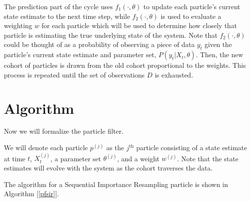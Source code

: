 	The prediction part of the cycle uses $f_1 (\cdot, \theta)$ to update each particle's current state estimate to the next time step, while $f_2 (\cdot, \theta)$ is used to evaluate a weighting $w$ for each particle which will be used to determine how closely that particle is estimating the true underlying state of the system. Note that $f_2 (\cdot, \theta)$ could be thought of as a probability of observing a piece of data $y_t$ given the particle's current state estimate and parameter set, $P(y_t | X_t, \theta)$. Then, the new cohort of particles is drawn from the old cohort proportional to the weights. This process is repeated until the set of observations $D$ is exhausted.


\section{Algorithm}

    Now we will formalize the particle filter.

    We will denote each particle $p^{(j)}$ as the $j^{\text{th}}$ particle consisting of a state estimate at time $t$, $X_t^{(j)}$, a parameter set $\theta^{(j)}$, and a weight $w^{(j)}$. Note that the state estimates will evolve with the system as the cohort traverses the data.

    The algorithm for a Sequential Importance Resampling particle is shown in Algorithm [\ref{pfsir}].
    
